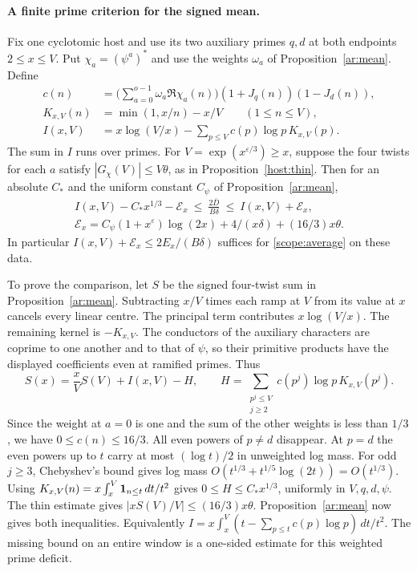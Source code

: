 \paragraph{A finite prime criterion for the signed mean.}
Fix one cyclotomic host and use its two auxiliary primes \(q,d\) at
both endpoints \(2\le x\le V\). Put \(\chi_a=(\psi^a)^\ast\) and use
the weights \(\omega_a\) of Proposition~\ref{ar:mean}. Define
\[
\begin{aligned}
 c(n)&=\Big(\sum_{a=0}^{o-1}\omega_a\Re\chi_a(n)\Big)
                   (1+J_q(n))(1-J_d(n)),\\
 K_{x,V}(n)&=\min(1,x/n)-x/V\qquad (1\le n\le V),\\
 I(x,V)&=x\log(V/x)-\sum_{p\le V}c(p)\log p\,K_{x,V}(p).
\end{aligned}
\]
The sum in \(I\) runs over primes. For \(V=\exp(x^{\varepsilon/3})\ge x\),
suppose the four twists for each \(a\) satisfy
\(|G_\chi(V)|\le V\theta\), as in Proposition~\ref{host:thin}.
Then for an absolute \(C_*\) and the uniform constant \(C_\psi\) of
Proposition~\ref{ar:mean},
\[
\begin{gathered}
 I(x,V)-C_*x^{1/3}-\mathcal E_x
 \ \le\ \frac{2\bar D}{B\delta}\ \le\ I(x,V)+\mathcal E_x,\\
 \mathcal E_x=C_\psi(1+x^\varepsilon)\log(2x)+4/(x\delta)
                                      +(16/3)x\theta .
\end{gathered}
\]
In particular \(I(x,V)+\mathcal E_x\le 2E_x/(B\delta)\) suffices
for \eqref{scope:average} on these data.

To prove the comparison, let \(S\) be the signed four-twist sum in
Proposition~\ref{ar:mean}. Subtracting \(x/V\) times each ramp at \(V\)
from its value at \(x\) cancels every linear centre. The principal
term contributes \(x\log(V/x)\). The remaining kernel is \(-K_{x,V}\).
The conductors of the auxiliary characters are coprime to one another
and to that of \(\psi\), so their primitive products have the
displayed coefficients even at ramified primes. Thus
\[
 S(x)=\frac{x}{V}S(V)+I(x,V)-H,\qquad
 H=\sum_{\substack{p^j\le V\\ j\ge2}}
                   c(p^j)\log p\,K_{x,V}(p^j).
\]
Since the weight at \(a=0\) is one and the sum of the other weights
is less than \(1/3\), we have \(0\le c(n)\le16/3\). All even powers
of \(p\ne d\) disappear. At \(p=d\) the even powers up to \(t\)
carry at most \((\log t)/2\) in unweighted log mass. For odd \(j\ge3\),
Chebyshev's bound gives log mass
\(O(t^{1/3}+t^{1/5}\log(2t))=O(t^{1/3})\). Using
\(K_{x,V}(n)=x\int_x^V {\bf 1}_{n\le t}\,dt/t^2\) gives
\(0\le H\le C_*x^{1/3}\), uniformly in \(V,q,d,\psi\).
The thin estimate gives \(|xS(V)/V|\le (16/3)x\theta\).
Proposition~\ref{ar:mean} now gives both inequalities.
Equivalently \(I=x\int_x^V(t-\sum_{p\le t}c(p)\log p)\,dt/t^2\).
The missing bound on an entire window is a one-sided estimate for
this weighted prime deficit.


